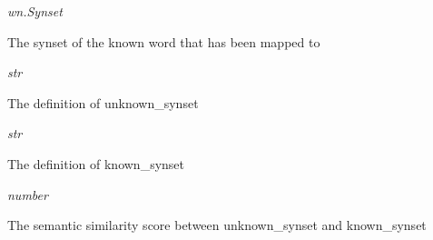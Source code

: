 \documentclass[letterpaper,10pt,english]{sphinxmanual}
\begin{document}
\begin{fulllineitems}

\begin{fulllineitems}
\label{wntest:semsim.wntest.SemanticSimilarityResult.known_synset}
\emph{wn.Synset}

The synset of the known word that has been mapped to

\end{fulllineitems}


\begin{fulllineitems}
\label{wntest:semsim.wntest.SemanticSimilarityResult.unknown_defintion}
\emph{str}

The definition of unknown\_synset

\end{fulllineitems}


\begin{fulllineitems}
\label{wntest:semsim.wntest.SemanticSimilarityResult.known_definition}
\emph{str}

The definition of known\_synset

\end{fulllineitems}


\begin{fulllineitems}
\label{wntest:semsim.wntest.SemanticSimilarityResult.sem_sim_score}
\emph{number}

The semantic similarity score between unknown\_synset and known\_synset

\end{fulllineitems}


\end{fulllineitems}

\end{document}
